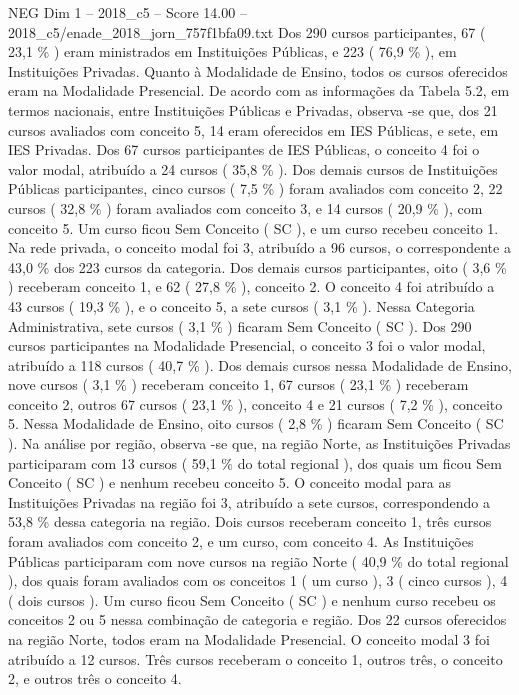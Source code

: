 \begin{textsample}{NEG Dim 1 – 2018\_c5 – Score 14.00 – 2018\_c5/enade\_2018\_jorn\_757f1bfa09.txt}
Dos 290 cursos participantes, 67 ( 23,1 \% ) eram ministrados em Instituições Públicas, e 223 ( 76,9 \% ), em Instituições Privadas.
Quanto à Modalidade de Ensino, todos os cursos oferecidos eram na Modalidade Presencial.
De acordo com as informações da Tabela 5.2, em termos nacionais, entre Instituições Públicas e Privadas, observa -se que, dos 21 cursos avaliados com conceito 5, 14 eram oferecidos em IES Públicas, e sete, em IES Privadas.
Dos 67 cursos participantes de IES Públicas, o conceito 4 foi o valor modal, atribuído a 24 cursos ( 35,8 \% ).
Dos demais cursos de Instituições Públicas participantes, cinco cursos ( 7,5 \% ) foram avaliados com conceito 2, 22 cursos ( 32,8 \% ) foram avaliados com conceito 3, e 14 cursos ( 20,9 \% ), com conceito 5.
Um curso ficou Sem Conceito ( SC ), e um curso recebeu conceito 1.
Na rede privada, o conceito modal foi 3, atribuído a 96 cursos, o correspondente a 43,0 \% dos 223 cursos da categoria.
Dos demais cursos participantes, oito ( 3,6 \% ) receberam conceito 1, e 62 ( 27,8 \% ), conceito 2.
O conceito 4 foi atribuído a 43 cursos ( 19,3 \% ), e o conceito 5, a sete cursos ( 3,1 \% ).
Nessa Categoria Administrativa, sete cursos ( 3,1 \% ) ficaram Sem Conceito ( SC ).
Dos 290 cursos participantes na Modalidade Presencial, o conceito 3 foi o valor modal, atribuído a 118 cursos ( 40,7 \% ).
Dos demais cursos nessa Modalidade de Ensino, nove cursos ( 3,1 \% ) receberam conceito 1, 67 cursos ( 23,1 \% ) receberam conceito 2, outros 67 cursos ( 23,1 \% ), conceito 4 e 21 cursos ( 7,2 \% ), conceito 5.
Nessa Modalidade de Ensino, oito cursos ( 2,8 \% ) ficaram Sem Conceito ( SC ).
Na análise por região, observa -se que, na região Norte, as Instituições Privadas participaram com 13 cursos ( 59,1 \% do total regional ), dos quais um ficou Sem Conceito ( SC ) e nenhum recebeu conceito 5.
O conceito modal para as Instituições Privadas na região foi 3, atribuído a sete cursos, correspondendo a 53,8 \% dessa categoria na região.
Dois cursos receberam conceito 1, três cursos foram avaliados com conceito 2, e um curso, com conceito 4.
As Instituições Públicas participaram com nove cursos na região Norte ( 40,9 \% do total regional ), dos quais foram avaliados com os conceitos 1 ( um curso ), 3 ( cinco cursos ), 4 ( dois cursos ).
Um curso ficou Sem Conceito ( SC ) e nenhum curso recebeu os conceitos 2 ou 5 nessa combinação de categoria e região.
Dos 22 cursos oferecidos na região Norte, todos eram na Modalidade Presencial.
O conceito modal 3 foi atribuído a 12 cursos.
Três cursos receberam o conceito 1, outros três, o conceito 2, e outros três o conceito 4.

\end{textsample}
